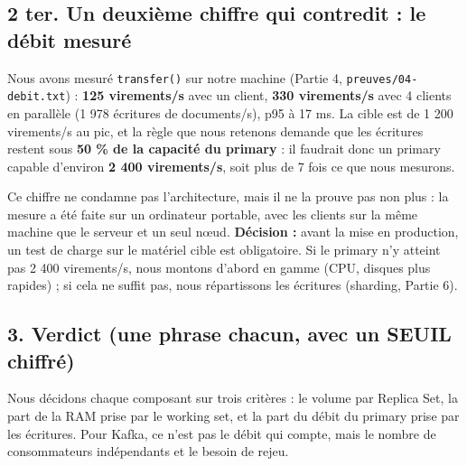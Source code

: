 \documentclass[11pt,a4paper]{article}
\begin{document}
	\subsection*{2 ter. Un deuxième chiffre qui contredit : le débit mesuré}
	
	Nous avons mesuré \texttt{transfer()} sur notre machine (Partie 4, \texttt{preuves/04-debit.txt}) : \textbf{125 virements/s} avec un client, \textbf{330 virements/s} avec 4 clients en parallèle (1 978 écritures de documents/s), p95 à 17 ms. La cible est de 1 200 virements/s au pic, et la règle que nous retenons demande que les écritures restent sous \textbf{50 \% de la capacité du primary} : il faudrait donc un primary capable d'environ \textbf{2 400 virements/s}, soit plus de 7 fois ce que nous mesurons.
	
	Ce chiffre ne condamne pas l'architecture, mais il ne la prouve pas non plus : la mesure a été faite sur un ordinateur portable, avec les clients sur la même machine que le serveur et un seul nœud. \textbf{Décision :} avant la mise en production, un test de charge sur le matériel cible est obligatoire. Si le primary n'y atteint pas 2 400 virements/s, nous montons d'abord en gamme (CPU, disques plus rapides) ; si cela ne suffit pas, nous répartissons les écritures (sharding, Partie 6).
	
	\subsection*{3. Verdict (une phrase chacun, avec un SEUIL chiffré)}
	
	Nous décidons chaque composant sur trois critères : le volume par Replica Set, la part de la RAM prise par le working set, et la part du débit du primary prise par les écritures. Pour Kafka, ce n'est pas le débit qui compte, mais le nombre de consommateurs indépendants et le besoin de rejeu.
	
\end{document}
